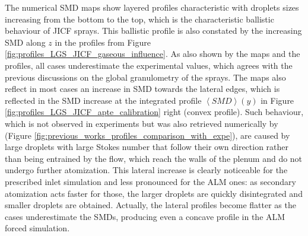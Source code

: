 The numerical SMD maps show layered profiles characteristic with droplets sizes increasing from the bottom to the top, which is the characteristic ballistic behaviour of JICF sprays. This ballistic profile is also constated by the increasing SMD along $z$ in the profiles from Figure \ref{fig:profiles_LGS_JICF_gaseous_influence}. As also shown by the maps and the profiles, all cases underestimate the experimental values, which agrees with the previous discussions on the global granulometry of the sprays. The maps also reflect in most cases an increase in SMD towards the lateral edges, which is reflected in the SMD increase at the integrated profile $\left\langle SMD \right\rangle \left( y \right)$ in Figure \ref{fig:profiles_LGS_JICF_apte_calibration} right (convex profile). Such behaviour, which is not observed in experiments but was also retrieved numerically by  (Figure \ref{fig:previous_works_profiles_comparison_with_expe}), are caused by large droplets with large Stokes number that follow their own direction rather than being entrained by the flow, which reach the walls of the plenum and do not undergo further atomization. This lateral increase is clearly noticeable for the prescribed inlet simulation and less pronounced for the ALM ones: as secondary atomization acts faster for those, the larger droplets are quickly disintegrated and smaller droplets are obtained. Actually, the lateral profiles become flatter as the cases underestimate the SMDs, producing even a concave profile in the ALM forced simulation.





\clearpage


